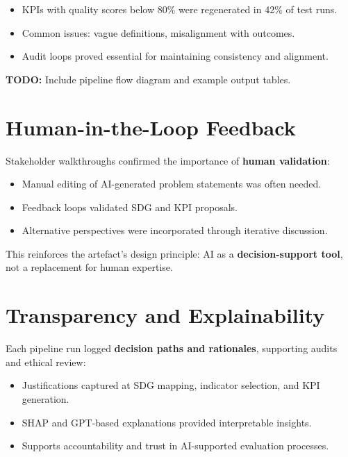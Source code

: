 \begin{itemize}
    \item KPIs with quality scores below 80\% were regenerated in 42\% of test runs.  
    \item Common issues: vague definitions, misalignment with outcomes.  
    \item Audit loops proved essential for maintaining consistency and alignment.  
\end{itemize}

\textbf{TODO:} Include pipeline flow diagram and example output tables.

\section{Human-in-the-Loop Feedback}\label{sec:results-hitl}

Stakeholder walkthroughs confirmed the importance of \textbf{human validation}:

\begin{itemize}
    \item Manual editing of AI-generated problem statements was often needed.  
    \item Feedback loops validated SDG and KPI proposals.  
    \item Alternative perspectives were incorporated through iterative discussion.  
\end{itemize}

This reinforces the artefact’s design principle: AI as a \textbf{decision-support tool}, not a replacement for human expertise.

\section{Transparency and Explainability}\label{sec:results-xai}

Each pipeline run logged \textbf{decision paths and rationales}, supporting audits and ethical review:

\begin{itemize}
    \item Justifications captured at SDG mapping, indicator selection, and KPI generation.  
    \item SHAP and GPT-based explanations provided interpretable insights.  
    \item Supports accountability and trust in AI-supported evaluation processes.  
\end{itemize}

